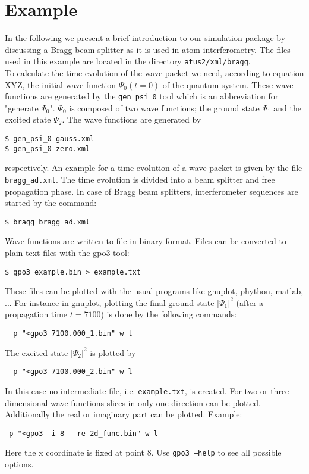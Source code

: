 \documentclass[12pt]{article}
\begin{document}
\section{Example}
\label{sec:example}
In the following we present a brief introduction to our simulation package by discussing
a Bragg beam splitter as it is used in atom interferometry. 
The files used in this example are located in
the directory \texttt{atus2/xml/bragg}.\\
To calculate the time evolution of the wave packet 
we need, according to equation XYZ, the initial wave function $\Psi_0(t=0)$ of the
quantum system.
These wave functions are generated by the
\texttt{gen_psi_0} tool which is an abbreviation for "generate $\Psi_0$".
$\Psi_0$ is composed of two wave functions; the ground state $\Psi_1$
and the excited state $\Psi_2$. The wave functions are generated by
\begin{verbatim}
$ gen_psi_0 gauss.xml
$ gen_psi_0 zero.xml
\end{verbatim}
respectively. An example for a time evolution of a wave packet is given by the file 
\texttt{bragg_ad.xml}. The time evolution is divided into a beam splitter
and free propagation phase. In case of Bragg beam splitters,
interferometer sequences are started by the command:
\begin{verbatim}
$ bragg bragg_ad.xml
\end{verbatim}
Wave functions are written to file in binary format. Files can be converted to plain
text files with the gpo3 tool:
\begin{verbatim}
$ gpo3 example.bin > example.txt
\end{verbatim}
These files can be plotted with the usual programs like gnuplot, phython, matlab, ...
For instance in gnuplot, plotting the final ground state $|\Psi_1|^2$ (after a propagation time $t=7100$) is done by the following commands:
\begin{verbatim}
  p "<gpo3 7100.000_1.bin" w l
\end{verbatim}
The excited state $|\Psi_2|^2$ is plotted by 
\begin{verbatim}
  p "<gpo3 7100.000_2.bin" w l
\end{verbatim}
In this case no intermediate file, i.e. \texttt{example.txt}, is created. 
For two or three dimensional wave functions slices in only one direction can be plotted.  
Additionally the real or imaginary part can be plotted. Example:
\begin{verbatim}
 p "<gpo3 -i 8 --re 2d_func.bin" w l
\end{verbatim}
Here the x coordinate is fixed at point 8. Use \texttt{gpo3 --help} to see
all possible options.
\end{document}

